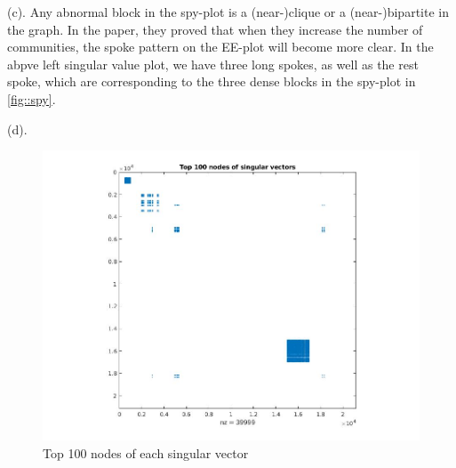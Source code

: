 \documentclass[11pt]{article}
\begin{document}
\noindent
(c).
Any abnormal block in the spy-plot is a (near-)clique or a (near-)bipartite in the graph. In the paper, they proved that when they increase the number of communities, the spoke pattern on the EE-plot will become more clear. In the abpve left singular value plot, we have three long spokes, as well as the rest spoke, which are corresponding to the three dense blocks in the spy-plot in \ref{fig::spy}.

\noindent
(d).
\begin{figure}[H]
    \centering
    \includegraphics[width=\linewidth]{figs/q3_d.jpg}
    \caption{Top 100 nodes of each singular vector}
    \label{fig::sub}
\end{figure}
\end{document}
